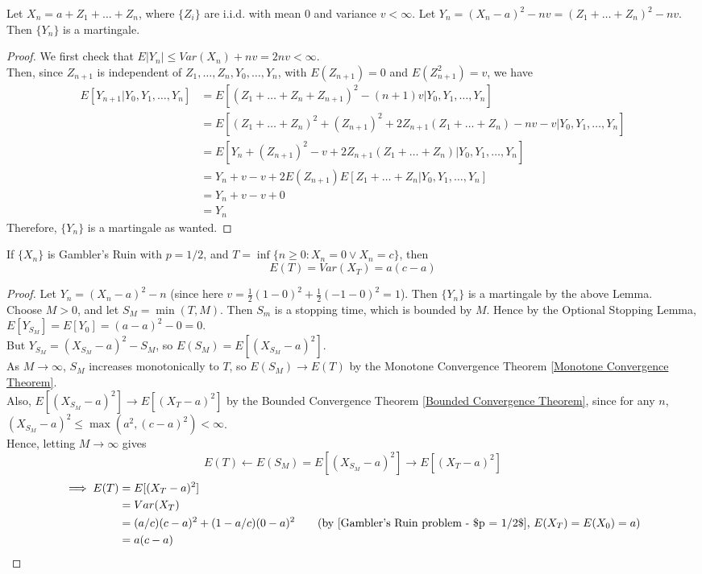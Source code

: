 \documentclass[11pt]{article}
\begin{document}
    \lemma Let $X_n = a + Z_1 + \hdots + Z_n$, where $\{Z_i\}$ are i.i.d. with mean 0 and variance $v < \infty$. Let $Y_n = (X_n - a)^2 - nv = (Z_1 + \hdots + Z_n)^2 - nv$. Then $\{Y_n\}$ is a martingale.
    \begin{proof}
    	We first check that $E|Y_n| \leq Var(X_n) + nv = 2nv < \infty$.\\
    	Then, since $Z_{n+1}$ is independent of $Z_1, \hdots, Z_n, Y_0, \hdots, Y_n$, with $E(Z_{n+1}) = 0$ and $E(Z_{n+1}^2) = v$, we have
    	\begin{align*}
    		E[Y_{n+1}|Y_0, Y_1, \hdots, Y_n] &= E[(Z_1 + \hdots + Z_n + Z_{n+1})^2 - (n+1)v|Y_0, Y_1, \hdots, Y_n] \\
    		&= E[(Z_1 + \hdots + Z_n)^2 + (Z_{n+1})^2 + 2Z_{n+1}(Z_1 + \hdots + Z_n) - nv - v|Y_0, Y_1, \hdots, Y_n]\\
    		&= E[Y_n + (Z_{n+1})^2 -v + 2Z_{n+1}(Z_1 + \hdots + Z_n) | Y_0, Y_1, \hdots, Y_n]\\
    		&= Y_n + v - v + 2E(Z_{n+1})E[Z_1 + \hdots + Z_n | Y_0, Y_1, \hdots, Y_n] \\
    		&= Y_n + v - v + 0 \\
    		&= Y_n
    	\end{align*}
    	Therefore, $\{Y_n\}$ is a martingale as wanted.
    	
    \end{proof}
    \corollary If $\{X_n\}$ is Gambler's Ruin with $p = 1/2$, and $T = \inf\{n \geq 0: X_n = 0 \lor X_n = c\}$, then 
    $$E(T) = Var(X_T) = a(c-a)$$
    \begin{proof}
    	Let $Y_n = (X_n - a)^2 - n$ (since here $v = \frac{1}{2}(1 - 0)^2 + \frac{1}{2}(-1 - 0)^2 = 1$).
    	Then $\{Y_n\}$ is a martingale by the above Lemma.\\
    	Choose $M > 0$, and let $S_M = \min(T, M)$. Then $S_m$ is a stopping time, which is bounded by $M$. Hence by the Optional Stopping Lemma, $E[Y_{S_M}] = E[Y_0] = (a-a)^2 - 0 = 0$.\\
    	But $Y_{S_M} = (X_{S_M} - a)^2 - S_M$, so $E(S_M) = E[(X_{S_M} - a)^2]$. \\
    	As $M \rightarrow \infty$, $S_M$ increases monotonically to $T$, so $E(S_M) \rightarrow E(T)$ by the Monotone Convergence Theorem \ref{Monotone Convergence Theorem}.\\
    	Also, $E[(X_{S_M} - a)^2] \rightarrow E[(X_T - a)^2]$ by the Bounded Convergence Theorem \ref{Bounded Convergence Theorem}, since for any $n$, $(X_{S_M} - a)^2 \leq \max(a^2, (c-a)^2) < \infty$.\\
    	Hence, letting $M \rightarrow \infty$ gives 
    	$$E(T) \leftarrow E(S_M) = E[(X_{S_M} - a)^2] \rightarrow E[(X_T - a)^2]$$
    	\begin{align*}
    		\implies E(T) &= E[(X_T - a)^2] \\
    		&= Var(X_T) \\
    		&= (a/c)(c-a)^2 + (1-a/c)(0-a)^2 \tag{by \ref{Gambler's Ruin problem - $p = 1/2$}, $E(X_T) = E(X_0) = a$}\\
    		&= a(c-a)
    	\end{align*}
    	
    \end{proof}
\end{document}
